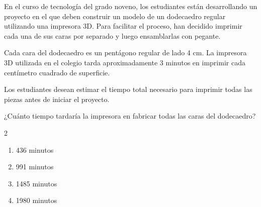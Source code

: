 En el curso de tecnología del grado noveno, los estudiantes están desarrollando un proyecto en el que deben construir un modelo de un dodecaedro regular utilizando una impresora 3D. Para facilitar el proceso, han decidido imprimir cada una de sus caras por separado y luego ensamblarlas con pegante.

Cada cara del dodecaedro es un pentágono regular de lado 4 cm. La impresora 3D utilizada en el colegio tarda aproximadamente 3 minutos en imprimir cada centímetro cuadrado de superficie.

Los estudiantes desean estimar el tiempo total necesario para imprimir todas las piezas antes de iniciar el proyecto.

¿Cuánto tiempo tardaría la impresora en fabricar todas las caras del dodecaedro?

\begin{multicols}{2}
\begin{enumerate}[label=\alph*), leftmargin=*]
\item 436 minutos
\item 991 minutos
\item 1485 minutos
\item 1980 minutos
\end{enumerate}
\end{multicols}